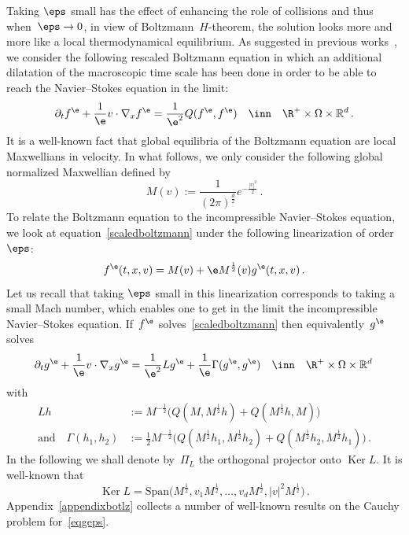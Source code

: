 Taking $\eps$ small has the effect of enhancing the role of collisions and thus when~$\eps \to 0$, in view of Boltzmann~$H$-theorem, the solution looks more and more like a local thermodynamical equilibrium. As suggested in previous works~\cite{bgl1}, we consider the following rescaled Boltzmann equation in which an additional dilatation of the macroscopic time scale has been done in order to be able to reach the Navier--Stokes equation in the limit:
\begin{equation}\label{scaledboltzmann}
\partial_t f^\e + \frac1\e v \cdot \nabla_x f^\e = \frac1{\e^2} Q(f^\e,f^\e) \quad \inn \quad \R^+ \times \Omega \times {\mathbb R}^d \,.
\end{equation}
It is a well-known fact that global equilibria of the Boltzmann equation are local Maxwellians in velocity. In what follows, we only consider the following global normalized Maxwellian defined by
\[
M(v):=\frac1{(2\pi)^\frac d2} e^{-\frac{|v|^2}2} \,.
\]
To relate the Boltzmann equation to the incompressible Navier--Stokes equation, we look at equation~\eqref{scaledboltzmann} under the following linearization of order $\eps$:
\begin{equation}\label{eq:linearization}
f^\e(t,x,v)= M(v) + \e M^\frac12(v) g^\e(t,x,v)\,.
\end{equation}
Let us recall that taking $\eps$ small in this linearization corresponds to taking a small Mach number, which enables one to get in the limit the incompressible Navier--Stokes equation. If~$f^\e$ solves~\eqref{scaledboltzmann} then equivalently~$g^\e$ solves
\begin{equation}\label{eqgeps}
\partial_t g^\e + \frac1\e v \cdot\nabla_x g^\e = \frac1{\e^2} Lg^\e + \frac1\e\Gamma(g^\e,g^\e) \quad \inn \quad \R^+ \times \Omega\times {\mathbb R}^d\,
\end{equation}
with
\begin{equation}\label{defoperator}
\begin{aligned}
Lh & :=M^{-\frac12}\big(Q(M,M^\frac12 h) + Q(M^\frac12 h,M)
\big)\\
\text{and} \quad \Gamma (h_1,h_2) &:=\frac12M^{-\frac12}
\big(Q(M^\frac12 h_1,M^\frac12 h_2) + Q(M^\frac12 h_2,M^\frac12 h_1)\big)\,.
\end{aligned}
\end{equation}
In the following we shall denote by~$
\Pi_{L} $ the orthogonal projector onto $\operatorname{Ker} L$. It is well-known that
\[
\operatorname{Ker} L = \text{Span} \big(M^\frac12, v_1M^\frac12, \dots, v_dM^\frac12, |v|^2M^\frac12\big) \,.
\]
Appendix~\ref{appendixbotlz} collects a number of well-known results on the Cauchy problem for~\eqref{eqgeps}.



